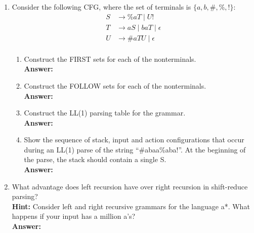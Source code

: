 \documentclass[11pt]{article}
\begin{document}
\begin{enumerate}
  
  \newpage
  \item Consider the following CFG, where the set of terminals is $\{a, b, \#, \%, !\}$:
  \begin{equation*}
    \begin{split}
      S &\to \%aT\mid U!\\
      T &\to aS \mid baT \mid \epsilon \\
      U &\to \#aTU \mid \epsilon \\
    \end{split}
  \end{equation*}
  \begin{enumerate}
    \item Construct the FIRST sets for each of the nonterminals.\\
    \textbf{Answer:} 
    
    \newpage
    \item Construct the FOLLOW sets for each of the nonterminals.  \\
    \textbf{Answer:} 
    
    \newpage
     \item  Construct the LL(1) parsing table for the grammar.\\
    \textbf{Answer:} 
    
    \newpage
    \item Show the sequence of stack, input and action configurations that occur during an LL(1) parse of the string “\#abaa\%aba!”. At the beginning of the parse, the stack should contain a single S.\\
    \textbf{Answer:} 

  \newpage
  \end{enumerate}
  \item What advantage does left recursion have over right recursion in shift-reduce parsing?\\
\textbf{Hint:} Consider left and right recursive grammars for the language a*. What happens if your input has a million a’s? \\
    \textbf{Answer:} 
    

\end{enumerate}
\end{document}
